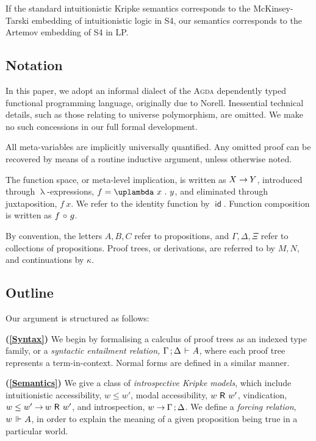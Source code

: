 \documentclass[submission,copyright,creativecommons,sharealike,backref=page]{eptcs}
\newcommand{\R}{\mathrel{\rlap{$\mkern.75mu\textsf{R}$}\hphantom{\subseteq}}}
\renewcommand{\:}{\mathop{\mkern3mu:\mkern3mu}}
\renewcommand{\.}{\mathop{\mkern3mu.\mkern3mu}}
\renewcommand{\;}{\mathop{;}}
\renewcommand{\,}{\mathop{,}}
\renewcommand{\o}{\mathop{\mkern3mu\circ\mkern3mu}}
\newcommand{\id}{\operatorname{\textsf{id}}}
\newcommand{\e}{\mathrel{\mkern2mu\vdash\mkern1mu}}
\newcommand{\ee}{\mathrel{\mkern2mu\Vdash\mkern1mu}}
\renewcommand{\r}{\mathrel{\rightarrow\mkern-1mu}}
\theoremstyle{mystyle}
\begin{document}
If the standard intuitionistic Kripke semantics corresponds to the McKinsey-Tarski\cite{McKinseyT48} embedding of intuitionistic logic in S4, our semantics corresponds to the Artemov embedding of S4 in LP.


\subsection*{Notation}

In this paper, we adopt an informal dialect of the \textsc{Agda} dependently typed functional programming language, originally due to Norell\cite{Norell07}.  Inessential technical details, such as those relating to universe polymorphism, are omitted.  We make no such concessions in our full formal development.

All meta-variables are implicitly universally quantified.  Any omitted proof can be recovered by means of a routine inductive argument, unless otherwise noted.  

The function space, or meta-level implication, is written as $X \r Y$, introduced through $\uplambda$-expressions, $f = \uplambda~x \. y$, and eliminated through juxtaposition, $f~x$.  We refer to the identity function by $\id$.  Function composition is written as $f \o g$.

By convention, the letters $A, B, C$ refer to propositions, and $\Gamma, \Delta, \Xi$ refer to collections of propositions.  Proof trees, or derivations, are referred to by $M, N$, and continuations by $\kappa$.


\subsection*{Outline}

Our argument is structured as follows:

\textbf{(\ref{Syntax})} We begin by formalising a calculus of proof trees as an indexed type family, or a \emph{syntactic entailment relation,} $\Gamma \; \Delta \e A$, where each proof tree represents a term-in-context.  Normal forms are defined in a similar manner.

\textbf{(\ref{Semantics})} We give a class of \emph{introspective Kripke models}, which include intuitionistic accessibility, $w \le w'$, modal accessibility, $w \R w'$, vindication, $w \le w' \r w \R w'$, and introspection, $w \r \Gamma \; \Delta$.  We define a \emph{forcing relation}, $w \ee A$, in order to explain the meaning of a given proposition being true in a particular world.
\end{document}
